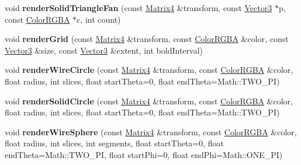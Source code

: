 \begin{DoxyCompactItemize}
\item 
void {\bfseries render\+Solid\+Triangle\+Fan} (const \hyperlink{class_magnum_1_1_matrix4}{Matrix4} \&transform, const \hyperlink{class_magnum_1_1_vector3}{Vector3} $\ast$p, const \hyperlink{class_magnum_1_1_color_r_g_b_a}{Color\+R\+G\+BA} $\ast$c, int count)\hypertarget{class_magnum_1_1_i_component_debug_renderer_a150fadcffa44ab9dad111073e82dae63}{}\label{class_magnum_1_1_i_component_debug_renderer_a150fadcffa44ab9dad111073e82dae63}

\item 
void {\bfseries render\+Grid} (const \hyperlink{class_magnum_1_1_matrix4}{Matrix4} \&transform, const \hyperlink{class_magnum_1_1_color_r_g_b_a}{Color\+R\+G\+BA} \&color, const \hyperlink{class_magnum_1_1_vector3}{Vector3} \&size, const \hyperlink{class_magnum_1_1_vector3}{Vector3} \&extent, int bold\+Interval)\hypertarget{class_magnum_1_1_i_component_debug_renderer_a3e96142f397cce0056193e67acb0328d}{}\label{class_magnum_1_1_i_component_debug_renderer_a3e96142f397cce0056193e67acb0328d}

\item 
void {\bfseries render\+Wire\+Circle} (const \hyperlink{class_magnum_1_1_matrix4}{Matrix4} \&transform, const \hyperlink{class_magnum_1_1_color_r_g_b_a}{Color\+R\+G\+BA} \&color, float radius, int slices, float start\+Theta=0, float end\+Theta=Math\+::\+T\+W\+O\+\_\+\+PI)\hypertarget{class_magnum_1_1_i_component_debug_renderer_ac6e55cbf2859be9ff89404eeb5631951}{}\label{class_magnum_1_1_i_component_debug_renderer_ac6e55cbf2859be9ff89404eeb5631951}

\item 
void {\bfseries render\+Solid\+Circle} (const \hyperlink{class_magnum_1_1_matrix4}{Matrix4} \&transform, const \hyperlink{class_magnum_1_1_color_r_g_b_a}{Color\+R\+G\+BA} \&color, float radius, int slices, float start\+Theta=0, float end\+Theta=Math\+::\+T\+W\+O\+\_\+\+PI)\hypertarget{class_magnum_1_1_i_component_debug_renderer_a3731cc6906c1658e2fdc62273d390e61}{}\label{class_magnum_1_1_i_component_debug_renderer_a3731cc6906c1658e2fdc62273d390e61}

\item 
void {\bfseries render\+Wire\+Sphere} (const \hyperlink{class_magnum_1_1_matrix4}{Matrix4} \&transform, const \hyperlink{class_magnum_1_1_color_r_g_b_a}{Color\+R\+G\+BA} \&color, float radius, int slices, int segments, float start\+Theta=0, float end\+Theta=Math\+::\+T\+W\+O\+\_\+\+PI, float start\+Phi=0, float end\+Phi=Math\+::\+O\+N\+E\+\_\+\+PI)\hypertarget{class_magnum_1_1_i_component_debug_renderer_a0b77ba6049876fd81bd6e4c41ecafb5d}{}\label{class_magnum_1_1_i_component_debug_renderer_a0b77ba6049876fd81bd6e4c41ecafb5d}


\end{DoxyCompactItemize}
